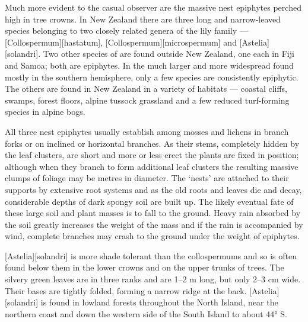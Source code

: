 Much more evident to the casual observer are the massive nest epiphytes perched high in tree crowns.
In New Zealand there are three long and narrow-leaved species belonging to two closely related genera of the lily family --- [Collospermum][hastatum], [Collospermum][microspermum] and [Astelia][solandri].
Two other species of  are found outside New Zealand, one each in Fiji and Samoa; both are epiphytes.
In the much larger and more widespread  found mostly in the southern hemisphere, only a few species are consistently epiphytic.
The others are found in New Zealand in a variety of habitats --- coastal cliffs, swamps, forest floors, alpine tussock grassland and a few reduced turf-forming species in alpine bogs.

All three nest epiphytes usually establish among mosses and lichens in branch forks or on inclined or horizontal branches.
As their stems, completely hidden by the leaf clusters, are short and more or less erect the plants are fixed in position; although when they branch to form additional leaf clusters the resulting massive clumps of foliage may be metres in diameter.
The `nests' are attached to their supports by extensive root systems and as the old roots and leaves die and decay, considerable depths of dark spongy soil are built up.
The likely eventual fate of these large soil and plant masses is to fall to the ground.
Heavy rain absorbed by the soil greatly increases the weight of the mass and if the rain is accompanied by wind, complete branches may crash to the ground under the weight of epiphytes.

[Astelia][solandri] is more shade tolerant than the collospermums and so is often found below them in the lower crowns and on the upper trunks of trees.
The silvery green leaves are in three ranks and are 1–2 m long, but only 2--3 cm wide.
Their bases are tightly folded, forming a narrow ridge at the back. [Astelia][solandri] is found in lowland forests throughout the North Island, near the northern coast and down the western side of the South Island to about 44° S.

